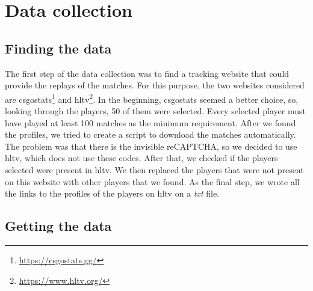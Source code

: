 
\chapter{Data collection}
\label{cap:analisi-requisiti}



\section{\label{sec:fi}Finding the data}

	The first step of the data collection was to find a tracking website that could provide the replays of the matches. 
	For this purpose, the two websites considered are csgostats\footnote{\href{https://csgostats.gg/}{https://csgostats.gg/}} and hltv\footnote{\href{https://www.hltv.org/}{https://www.hltv.org/}}.
	In the beginning, csgostats seemed a better choice, so, looking through the players, 50 of them were selected. 
	Every selected player must have played at least 100 matches as the minimum requirement. 
	After we found the profiles, we tried to create a script to download the matches automatically. 
	The problem was that there is the invisible reCAPTCHA, so we decided to use hltv, which does not use these codes. 
	After that, we checked if the players selected were present in hltv. 
	We then replaced the players that were not present on this website with other players that we found. 
	As the final step, we wrote all the links to the profiles of the players on hltv on a \emph{txt} file.

\section{\label{sec:do}Getting the data}

